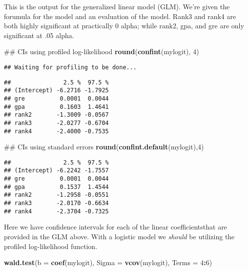 \documentclass[]{article}
\newenvironment{Shaded}{\begin{snugshade}}{\end{snugshade}}
\newcommand{\KeywordTok}[1]{\textcolor[rgb]{0.13,0.29,0.53}{\textbf{#1}}}
\newcommand{\DataTypeTok}[1]{\textcolor[rgb]{0.13,0.29,0.53}{#1}}
\newcommand{\DecValTok}[1]{\textcolor[rgb]{0.00,0.00,0.81}{#1}}
\newcommand{\OperatorTok}[1]{\textcolor[rgb]{0.81,0.36,0.00}{\textbf{#1}}}
\newcommand{\NormalTok}[1]{#1}
\begin{document}
This is the output for the generalized linear model (GLM). We're given
the forumula for the model and an evaluation of the model. Rank3 and
rank4 are both highly significant at practically 0 alpha; while rank2,
gpa, and gre are only significant at .05 alpha.

\begin{Shaded}
\begin{Highlighting}[]
\NormalTok{## CIs using profiled log-likelihood }
\KeywordTok{round}\NormalTok{(}\KeywordTok{confint}\NormalTok{(mylogit), }\DecValTok{4}\NormalTok{)}
\end{Highlighting}
\end{Shaded}

\begin{verbatim}
## Waiting for profiling to be done...
\end{verbatim}

\begin{verbatim}
##               2.5 %  97.5 %
## (Intercept) -6.2716 -1.7925
## gre          0.0001  0.0044
## gpa          0.1603  1.4641
## rank2       -1.3009 -0.0567
## rank3       -2.0277 -0.6704
## rank4       -2.4000 -0.7535
\end{verbatim}

\begin{Shaded}
\begin{Highlighting}[]
\NormalTok{## CIs using standard errors }
\KeywordTok{round}\NormalTok{(}\KeywordTok{confint.default}\NormalTok{(mylogit),}\DecValTok{4}\NormalTok{)}
\end{Highlighting}
\end{Shaded}

\begin{verbatim}
##               2.5 %  97.5 %
## (Intercept) -6.2242 -1.7557
## gre          0.0001  0.0044
## gpa          0.1537  1.4544
## rank2       -1.2958 -0.0551
## rank3       -2.0170 -0.6634
## rank4       -2.3704 -0.7325
\end{verbatim}

Here we have confidence intervals for each of the linear
coefficientsthat are provided in the GLM above. With a logistic model we
\emph{should} be utilizing the profiled log-likelihood function.

\begin{Shaded}
\begin{Highlighting}[]
\KeywordTok{wald.test}\NormalTok{(}\DataTypeTok{b =} \KeywordTok{coef}\NormalTok{(mylogit), }\DataTypeTok{Sigma =} \KeywordTok{vcov}\NormalTok{(mylogit), }\DataTypeTok{Terms =} \DecValTok{4}\OperatorTok{:}\DecValTok{6}\NormalTok{)}
\end{Highlighting}
\end{Shaded}
\end{document}
